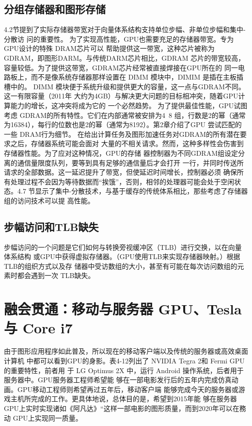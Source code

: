 \subsection{分组存储器和图形存储}
4.2节提到了实际存储器带宽对于向量体系结构支持单位步幅、非单位步幅和集中-分散访
问的重要性。
为了实现高性能，GPU也需要充足的存储器带宽。专为 GPU设计的特殊 DRAM芯片可以
帮助提供这一带宽，这种芯片被称为 GDRAM，即图形DARM。与传统DARM芯片相比，GDRAM
芯片的带宽较高，容量较低。为了提供这带宽，GDRAM芯片经常被直接焊接在GPU所在的
同一电路板上，而不是像系统存储器那样设置在 DIMM 模块中，DIMIM 是插在主板插槽中的。
DIMM 模块便于系统升级和提供更大的容量，这一点与GDRAM不同。这一有限容量（2011年
大约为4GB）与解决更大问题的目标相冲突，随着GPU计算能力的增长，这冲突将成为它的
一个必然趋势。
为了提供最佳性能，GPU试图考虑 GDRAM的所有特性。它们在内部通常被安排为4~8
组，行数是2的幂（通常为16384），每行的位数也是2的幂（通常为8192）。第2章介绍了GPU
尝试匹配的一些 DRAM行为细节。
在给出计算任务及图形加速任务对GDRAM的所有潜在要求之后，存储器系统可能会面对
大量的不相关请求。然而，这种多样性会伤害到存储器性能。为了应对这种情况，GPU的存储
器控制器为不同GDRAM组设定分离的通信量限度队列，要等到具有足够的通信量后才会打开
一行，并同时传送所请求的全部数据。这一延迟提升了带宽，但使延迟时间增长，控制器必须
确保所有处理过程不会因为等待数据而“挨饿”，否则，相邻的处理器可能会处于空闲状态。4.7
节显示了集中-分散技术，与基于缓存的传统体系相比，那些考虑了存储器组的访问技术可以提
高性能。

\subsection{步幅访问和TLB缺失}
步幅访问的一个问题是它们如何与转换旁视缓冲区（TLB）进行交换，以在向量体系结构
或GPU中获得虚拟存储器。（GPU使用TLB来实现存储器映射。）根据TLB的组织方式以及存
储器中受访数组的大小，甚至有可能在每次访问数组的元素时都会遇到一次 TLB缺失。

\section{融会贯通：移动与服务器 GPU、Tesla 与 Core i7}
由于图形应用程序如此普及，所以现在的移动客户端以及传统的服务器或高效桌面计算机
中都可以看到GPU的身影。表4-12列出了 NVIDIA Tegra 2和 Fermi GPU的重要特性，前者用
于 LG Optimus 2X 中，运行 Android 操作系统，后者用于服务器中。GPU服务器工程师希望能
够在一部电影发行后的五年内完成仿真动画。GPU移动工程师则希望再过五年后，移动客户端
能够完成今天的服务器或游戏主机所完成的工作。更具体地说，总体目的是，希望到2015年能
够在服务器 GPU上实时实现诸如《阿凡达》“这样一部电影的图形质量，而到2020年可以在務
动 GPU上实现同一质量。

